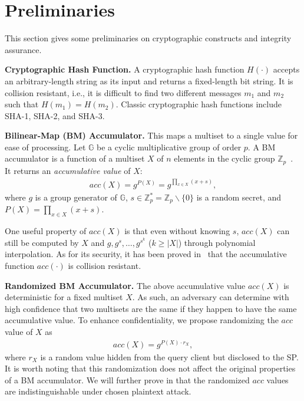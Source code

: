 \section{Preliminaries}\label{sec:aggregate-queries:prelim}

This section gives some preliminaries on cryptographic constructs and integrity assurance.

\textbf{Cryptographic Hash Function.}
A cryptographic hash function $H(\cdot)$ accepts an arbitrary-length string as its input and returns a fixed-length bit string. It is collision resistant, i.e., it is difficult to find two different messages $m_1$ and $m_2$ such that $H(m_1) = H(m_2)$. Classic cryptographic hash functions include SHA-1, SHA-2, and SHA-3.

\textbf{Bilinear-Map (BM) Accumulator.} This maps a multiset to a single value for ease of processing. Let $\mathbb{G}$ be a cyclic multiplicative group of order $p$. A BM accumulator is a function of a multiset $X$ of $n$ elements in the cyclic group $\mathbb{Z}_p$~\cite{10.1007/978-3-540-30574-3_19}. It returns an \emph{accumulative value} of $X$:
\begin{align}
  acc(X) = g^{P(X)} = g^{\prod_{x\in{X}}{(x+s)}},
\end{align}
where $g$ is a group generator of $\mathbb{G}$, $s \in \mathbb{Z}_p^* = \mathbb{Z}_p\backslash\{0\}$ is a random secret, and $P(X) = \prod_{x\in{X}}{(x+s)}$.

One useful property of $acc(X)$ is that even without knowing $s$, $acc(X)$ can still be computed by $X$ and $g, g^s, \dots, g^{s^k}$ ($k \ge |X|$) through polynomial interpolation. As for its security, it has been proved in~\cite{10.1007/s00453-014-9968-3} that the accumulative function $acc(\cdot)$ is collision resistant.

\textbf{Randomized BM Accumulator.} The above accumulative value $acc(X)$ is deterministic for a fixed multiset $X$. As such, an adversary can determine with high confidence that two multisets are the same if they happen to have the same accumulative value. To enhance confidentiality, we propose  randomizing the $acc$ value of $X$ as
\begin{align}
  acc(X) = g^{P(X) \cdot r_X},\label{eqn:aggregate-queries:random-bm}
\end{align}
where $r_X$ is a random value hidden from the query client but disclosed to the SP\@. It is worth noting that this randomization does not affect the original properties of a BM accumulator. We will further prove in  that the randomized $acc$ values are indistinguishable under chosen plaintext attack.

